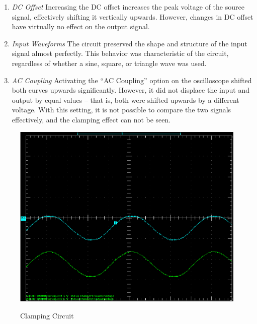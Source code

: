 \documentclass[twocolumn,english]{IEEEtran}
\begin{document}
\begin{enumerate}
  \item
    \textit{DC Offset}
    Increasing the DC offset increases the peak voltage of the source signal, effectively shifting it vertically upwards. However, changes in DC offset have virtually no effect on the output signal.
  \item
    \textit{Input Waveforms}
    The circuit preserved the shape and structure of the input signal almost perfectly. This behavior was characteristic of the circuit, regardless of whether a sine, square, or triangle wave was used.
  \item
    \textit{AC Coupling}
    Activating the ``AC Coupling'' option on the oscilloscope shifted both curves upwards significantly. However, it did not displace the input and output by equal values -- that is, both were shifted upwards by a different voltage. With this setting, it is not possible to compare the two signals effectively, and the clamping effect can not be seen.
\end{enumerate}

\begin{figure}[H]
  \begin{centering}
  \begin{center}
  \includegraphics[width=\linewidth]{./clamping_results.png}
  \label{fig:clamping_results}
  \caption{Clamping Circuit}
  \end{center}
  \par\end{centering}
\end{figure}
\end{document}

